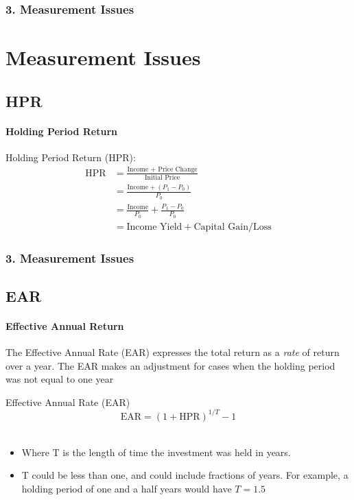 \documentclass{beamer}
\begin{document}
\begin{frame}[t]
    \frametitle{3. Measurement Issues}
    \section{Measurement Issues}
    \subsection{HPR}
    \framesubtitle{Holding Period Return}

    Holding Period Return (HPR):\\
   \begin{align*}
    \text{HPR} &= \frac{\text{Income + Price Change}}{\text{Initial Price}} \\
       &= \frac{\text{Income}+ (P_1-P_0)}{P_0}\\
        &=  \frac{\text{Income}}{P_0} + \frac{P_1-P_0}{P_0} \\
        &=   \text{Income Yield} + \text{Capital Gain/Loss}
    \end{align*}

\end{frame}

\begin{frame}[t]
    \frametitle{3. Measurement Issues}
    \subsection{EAR}
    \framesubtitle{Effective Annual Return}

    The Effective Annual Rate (EAR) expresses the total return as a \textit{rate} of return over a year.   The EAR makes an adjustment for cases when the holding period was not equal to one year\\
    \vspace{1em}

    Effective Annual Rate (EAR)\\
    $$\text{EAR} = (1+\text{HPR})^{1/T} - 1$$\\
    \begin{itemize}
        \item Where T is the length of time the investment was held in years.  
        \item T could be less than one, and could include fractions of years.   For example, a holding period of one and a half years would have $T=1.5$\\
    \end{itemize}

\end{frame}
\end{document}
